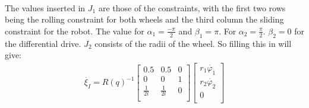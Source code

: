 \documentclass[a4paper, 20pt]{report}
\begin{document}
\begin{enumerate}
\begin{align*}
        \end{align*}
        The values inserted in $J_1$ are those of the constraints, with the
        first two rows being the rolling constraint for both wheels and the
        third column the sliding constraint for the robot.
        The value for $\alpha_1 = \frac{-\pi}{2}  $ and $\beta_1 =\pi$. For $\alpha_2
        = \frac{\pi}{2}$. 
        $\beta_2 = 0$ for the differential drive. $J_2$ consists of the radii of
        the wheel.
        So filling this in will give: 
        \begin{align*}
            \dot{\xi_I} = R(q)^{-1} 
            \begin{bmatrix}
                0.5 & 0.5 & 0 \\
                0   & 0   & 1 \\
                \frac{1}{2l} & \frac{1}{2l} &0\\
            \end{bmatrix}
            \begin{bmatrix}
                r_1\dot{\varphi_1} \\
                r_2\dot{\varphi_2} \\
                0\\
            \end{bmatrix}
        \end{align*}


\end{enumerate}
\end{document}

